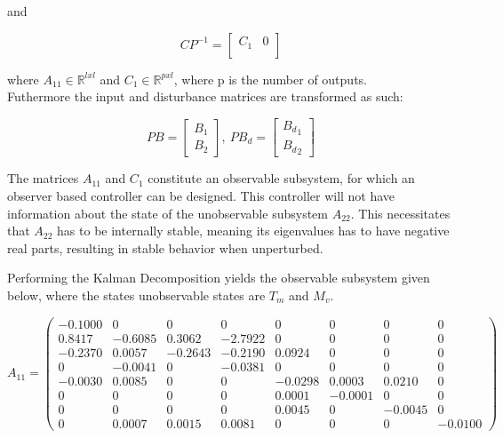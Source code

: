 and

\begin{equation}
	CP^{-1} = \begin{bmatrix}
		C_{1}       & 0 \\
	\end{bmatrix}
\end{equation}

where $A_{11} \in \mathbb{R} ^{l x l}$ and $C_{1} \in \mathbb{R} ^{p x l}$, where p is the number of outputs.\\Futhermore the input and disturbance matrices are transformed as such:

\begin{equation}
	PB = \begin{bmatrix}
		B_1 \\
		B_2
	\end{bmatrix}, \
	PB_d = \begin{bmatrix}
		{B_d}_1 \\
		{B_d}_2
	\end{bmatrix}
\end{equation}


The matrices $A_{11}$ and $C_{1}$ constitute an observable subsystem, for which an observer based controller can be designed. This controller will not have information about the state of the unobservable subsystem $A_{22}$. This necessitates that $A_{22}$ has to be internally stable, meaning its eigenvalues has to have negative real parts, resulting in stable behavior when unperturbed.

Performing the Kalman Decomposition yields the observable subsystem given below, where the states unobservable states are $ T_m $ and $ M_v $.

\begin{equation}  \label{eq:A11}
	A_{11} = \left(\begin{array}{cccccccc}
		-0.1000 &        0 &        0 &        0 &        0 &        0 &        0 &        0  \\
		0.8417 &  -0.6085 &   0.3062 &  -2.7922 &        0 &        0 &        0 &        0  \\
		-0.2370 &   0.0057 &  -0.2643 &  -0.2190 &   0.0924 &        0 &        0 &        0  \\
		0 &  -0.0041 &        0 &  -0.0381 &        0 &        0 &        0 &        0  \\
		-0.0030 &   0.0085 &        0 &        0 &  -0.0298 &   0.0003 &   0.0210 &        0  \\
		0 &        0 &        0 &        0 &   0.0001 &  -0.0001 &        0 &        0  \\
		0 &        0 &        0 &        0 &   0.0045 &        0 &  -0.0045 &        0  \\
		0 &   0.0007 &   0.0015 &   0.0081 &        0 &        0 &        0 &  -0.0100
	\end{array}\right)
\end{equation}

